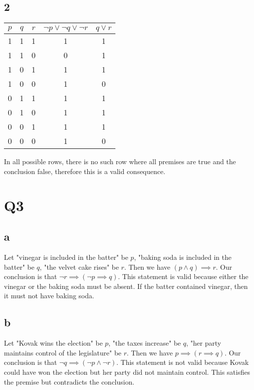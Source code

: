 \documentclass[12pt]{article}
\begin{document}
\subsection{2}
\begin{tabular}{ | c | c | c | c | c |}
    \hline
    $p$ & $q$ & $r$ & $\neg p \lor \neg q \lor \neg r$ & $q \lor r$ \\
    \hline
    1 & 1 & 1 & 1 & 1 \\
    \hline
    1 & 1 & 0 & 0 & 1 \\
    \hline
    1 & 0 & 1 & 1 & 1 \\
    \hline
    1 & 0 & 0 & 1 & 0 \\
    \hline
    0 & 1 & 1 & 1 & 1 \\
    \hline
    0 & 1 & 0 & 1 & 1 \\
    \hline
    0 & 0 & 1 & 1 & 1 \\
    \hline
    0 & 0 & 0 & 1 & 0 \\
    \hline
\end{tabular}
\newline
In all possible rows, there is no such row where all premises are true and the 
conclusion false, therefore this is a valid consequence.


\section{Q3}
\subsection{a}
Let "vinegar is included in the batter" be $p$, "baking soda is included in the batter" be $q$, 
"the velvet cake rises" be $r$. 
\newline
Then we have $(p \land q) \implies r$. Our conclusion is that $\neg r \implies (\neg p \implies q)$.
\newline
This statement is valid because either the vinegar or the baking soda must be absent. If the batter contained 
vinegar, then it must not have baking soda.

\subsection{b}
Let "Kovak wins the election" be $p$, "the taxes increase" be $q$, 
"her party maintains control of the legislature" be $r$. 
\newline
Then we have $p \implies (r \implies q)$. Our conclusion is that $\neg q \implies (\neg p \land \neg r)$.
\newline
This statement is not valid because Kovak could have won the election but her party did not maintain control. This 
satisfies the premise but contradicts the conclusion.
\end{document}
